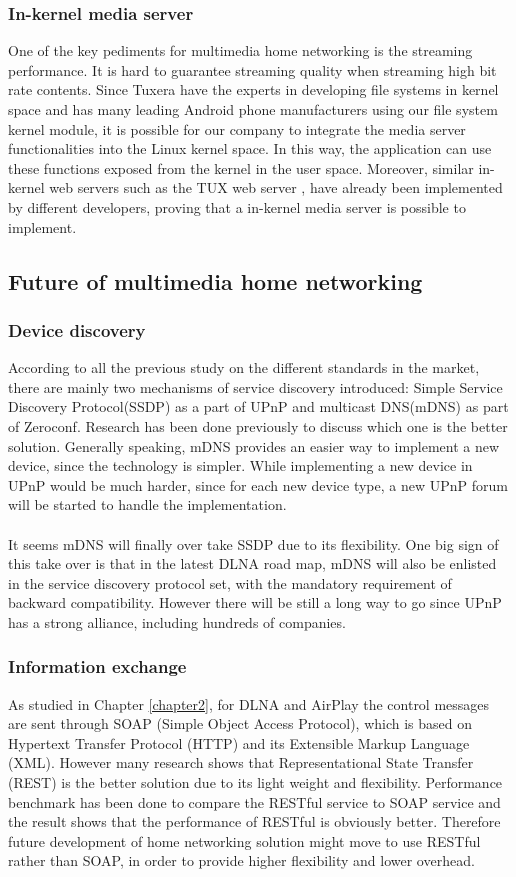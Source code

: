 \subsubsection{In-kernel media server}
One of the key pediments for multimedia home networking is the streaming performance. It is hard to guarantee streaming quality when streaming high bit rate contents. Since Tuxera have the experts in developing file systems in kernel space and has many leading Android phone manufacturers using our file system kernel module, it is possible for our company to integrate the media server functionalities into the Linux kernel space. In this way, the application can use these functions exposed from the kernel in the user space.
Moreover, similar in-kernel web servers such as the TUX web server \cite{tux_webserver}, have already been implemented by different developers, proving that a in-kernel media server is possible to implement.
\subsection{Future of multimedia home networking\label{5_3}}
\subsubsection{Device discovery}
According to all the previous study on the different standards in the market, there are mainly two mechanisms of service discovery introduced: Simple Service Discovery Protocol(SSDP) as a part of UPnP and multicast DNS(mDNS) as part of Zeroconf. Research \cite{zeroconf_vs_upnp} has been done previously to discuss which one is the better solution. Generally speaking, mDNS provides an easier way to implement a new device, since the technology is simpler. While implementing a new device in UPnP would be much harder, since for each new device type, a new UPnP forum will be started to handle the implementation.\\
\\
It seems mDNS will finally over take SSDP due to its flexibility. One big sign of this take over is that in the latest DLNA road map, mDNS will also be enlisted in the service discovery protocol set, with the mandatory requirement of  backward compatibility. However there will be still a long way to go since UPnP has a strong alliance, including hundreds of companies.
\subsubsection{Information exchange}
As studied in Chapter \ref{chapter2}, for DLNA and AirPlay the control messages are sent through SOAP (Simple Object Access Protocol), which is based on Hypertext Transfer Protocol (HTTP) and its Extensible Markup Language (XML). However many research \cite{restful_webservice} shows that Representational State Transfer (REST) is the better solution due to its light weight and flexibility. Performance benchmark \cite{performance_restful_saop} has been done to compare the RESTful service to SOAP service and the result shows that the performance of RESTful is obviously better. Therefore future development of home networking solution might move to use RESTful rather than SOAP,  in order to provide higher flexibility and lower overhead.
